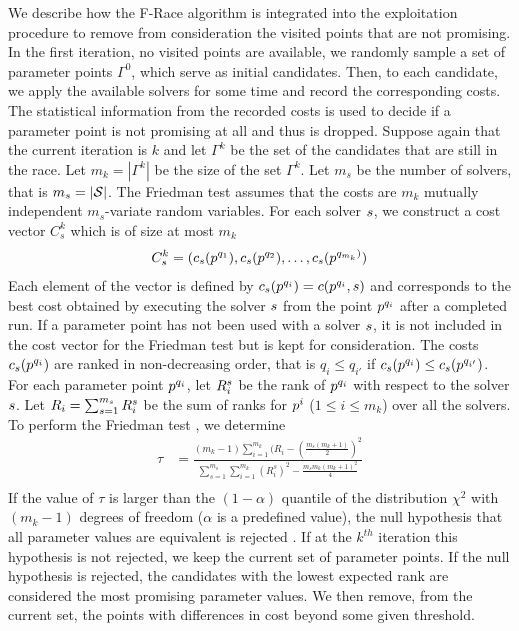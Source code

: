 We describe how the F-Race algorithm is integrated into the exploitation procedure to remove from consideration the visited points that are not promising. In the first iteration, no visited points are available, we randomly sample a set of parameter points $\Gamma^0$, which serve as initial candidates. Then, to each candidate, we apply the available solvers for some time and record the corresponding costs. The statistical information from the recorded costs is used to decide if a parameter point is not promising at all and thus is dropped. Suppose again that the current iteration is $k$ and let $\Gamma^k$ be the set of the candidates that are still in the race. Let $m_k = | \Gamma^k | $ be the size of the set $\Gamma^k$. Let $m_s$ be the number of solvers, that is $m_s = | \mathcal{S}|$. The Friedman test assumes that the costs are $m_k$ mutually independent $m_s$-variate random variables. For each solver $s$, we construct a cost vector $C^k_s$ which is of size at most $m_k$
\begin{eqnarray}\label{eq:C}
C^k_s = (c_{s}(p^{q_1}), c_{s}(p^{q_2}), \ldots, c_{s}(p^{q_{m_k})})
\end{eqnarray}
Each element of the vector is defined by $c_{s}(p^{q_i}) = c(p^{q_i}, s)$ and corresponds to the best cost obtained by executing the solver $s$ from the point $p^{q_i}$ after a completed run. If a parameter point has not been used with a solver $s$, it is not included in the cost vector for the Friedman test but is kept for consideration. The costs $c_{s}(p^{q_i})$ are ranked in non-decreasing order, that is $q_i \le q_{i'}$ if $c_{s}(p^{q_i}) \le c_{s}(p^{q_{i'}})$. For each parameter point $p^{q_i}$, let $R^{s}_{i}$ be the rank of $p^{q_i}$ with respect to the solver $s$. Let $R_{i} =  \sum_{s=1}^{m_s} R^{s}_{i}$ be the sum of ranks for $p^i$ ($1 \leq i \leq m_k$) over all the solvers. To perform the Friedman test \cite{GVK24551600X}, we determine
\begin{eqnarray*}
\displaystyle \tau & = \displaystyle{ \frac{ (m_k-1) \sum_{i=1}^{m_k} (R_i - (\frac{m_s(m_k+1)}{2})^2 } {\sum_{s=1}^{m_s} \sum_{i=1}^{m_k}  (R^s_{i})^2 -  \frac{m_s m_k (m_k+1)^2}{4} }}  \nonumber \\ 
\end{eqnarray*}
If the value of $\tau$ is larger than the $(1 - \alpha)$ quantile of the distribution $\chi^2$  with $(m_k - 1)$ degrees of freedom ($\alpha$ is a predefined value), the null hypothesis that all parameter values are equivalent is rejected \cite{AP91}. If at the $k^{th}$ iteration this hypothesis is not rejected, we keep the current set of parameter points. If the null hypothesis is rejected, the candidates with the lowest expected rank are considered the most promising parameter values. We then remove, from the current set, the points with differences in cost beyond some given threshold.  
 
